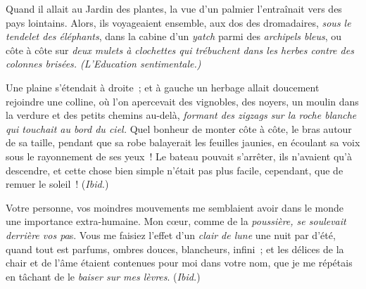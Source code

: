 \documentclass[french,twoside]{book} %
\newenvironment{quoteblock}%
  {\begin{quoting}}
  {\end{quoting}}
\newenvironment{quotebar}{%
    \def\FrameCommand{{\color{rubric!10!}\vrule width 0.5em} \hspace{0.9em}}%
    \def\OuterFrameSep{\itemsep} %
    \MakeFramed {\advance\hsize-\width \FrameRestore}
  }%
  {%
    \endMakeFramed
  }
\renewenvironment{quoteblock}%
  {%
    \savenotes
    \setstretch{0.9}
    \normalfont
    \begin{quotebar}
  }
  {%
    \end{quotebar}
    \spewnotes
  }
\begin{document}
\begin{quoteblock}
 \noindent Quand il allait au Jardin des plantes, la vue d’un palmier l’entraînait vers des pays lointains. Alors, ils voyageaient ensemble, aux dos des dromadaires, \emph{sous le tendelet des éléphants}, dans la cabine d’un \emph{yatch} parmi des \emph{archipels bleus}, ou côte à côte sur \emph{deux mulets à clochettes qui trébuchent dans les herbes contre des colonnes brisées. (L’Education sentimentale.)}\par
 Une plaine s’étendait à droite ; et à gauche un herbage allait doucement rejoindre une colline, où l’on apercevait des vignobles, des noyers, un moulin dans la verdure et des petits chemins au-delà, \emph{formant des zigzags sur la roche blanche qui touchait au bord du ciel.} Quel bonheur de monter côte à côte, le bras autour de sa taille, pendant que sa robe balayerait les feuilles jaunies, en écoulant sa voix sous le rayonnement de ses yeux ! Le bateau pouvait s’arrêter, ils n’avaient qu’à descendre, et cette chose bien simple n’était pas plus facile, cependant, que de remuer le soleil ! (\emph{Ibid.})\par
 Votre personne, vos moindres mouvements me semblaient avoir dans le monde une importance extra-humaine. Mon cœur, comme de la \emph{poussière, se soulevait derrière vos pa}s. Vous me faisiez l’effet d’un \emph{clair de lune} une nuit par d’été, quand tout est parfums, ombres douces, blancheurs, infini ; et les délices de la chair et de l’âme étaient contenues pour moi dans votre nom, que je me répétais en tâchant de le \emph{baiser sur mes lèvres}. (\emph{Ibid.})
 \end{quoteblock}
\end{document}
